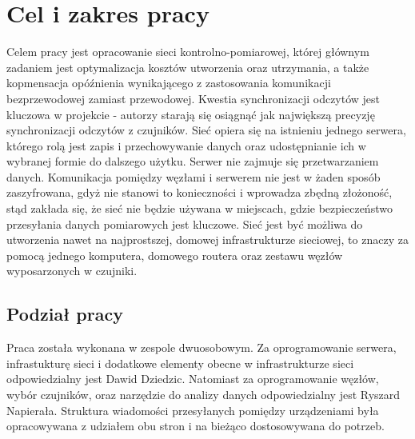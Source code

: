 \documentclass[12pt,oneside,a4paper]{book}
\theoremstyle{break}
\begin{document}
\chapter{Cel i zakres pracy}
Celem pracy jest opracowanie sieci kontrolno-pomiarowej,  której głównym 
zadaniem jest optymalizacja kosztów utworzenia oraz utrzymania, a także
kopmensacja opóźnienia wynikającego z zastosowania komunikacji bezprzewodowej 
zamiast przewodowej. Kwestia synchronizacji odczytów jest kluczowa w projekcie - 
autorzy starają się osiągnąć jak największą precyzję synchronizacji odczytów
z czujników. Sieć opiera się na istnieniu jednego  serwera,
którego rolą jest zapis i przechowywanie danych oraz udostępnianie ich 
w wybranej formie do dalszego użytku. Serwer nie zajmuje się
przetwarzaniem danych. Komunikacja pomiędzy węzłami i serwerem nie jest
w żaden sposób zaszyfrowana,  gdyż nie stanowi to konieczności i wprowadza 
zbędną złożoność, stąd zakłada się, że sieć nie będzie używana w miejscach, 
gdzie bezpieczeństwo przesyłania danych pomiarowych jest kluczowe. 
Sieć jest być możliwa do utworzenia nawet na najprostszej, domowej
infrastrukturze sieciowej, to znaczy za pomocą jednego komputera, domowego 
routera oraz zestawu węzłów wyposarzonych w czujniki.

\pagestyle{fancy}

\section{Podział pracy}
Praca została wykonana w zespole dwuosobowym. Za oprogramowanie
serwera, infrastukturę sieci i dodatkowe elementy
obecne w infrastrukturze sieci odpowiedzialny jest Dawid Dziedzic. 
Natomiast za oprogramowanie węzłów, wybór czujników, oraz narzędzie do analizy
 danych odpowiedzialny jest Ryszard Napierała. 
Struktura wiadomości przesyłanych pomiędzy urządzeniami była
opracowywana z udziałem obu stron 
i na bieżąco dostosowywana do potrzeb.
\end{document}
